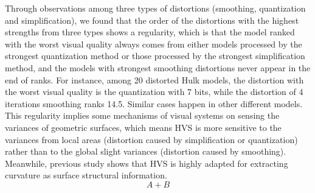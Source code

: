 Through observations among three types of distortions (smoothing, quantization and simplification), we found that the order of the distortions with the highest strengths from three types shows a regularity, which is that the model ranked with the worst visual quality always comes from either models processed by the strongest quantization method or those processed by the strongest simplification method, and the models with strongest smoothing distortions never appear in the end of ranks. For instance, among 20 distorted Hulk models, the distortion with the worst visual quality is the quantization with 7 bits, while the distortion of 4 iterations smoothing ranks 14.5.  Similar cases happen in other different models. This regularity implies some mechanisms of visual systems on sensing the variances of geometric surfaces, which means HVS is more sensitive to the variances from local areas (distortion caused by simplification or quantization) rather than to the global slight variances (distortion caused by smoothing). Meanwhile, previous study shows that HVS is highly adapted for extracting curvature as surface structural information.\\
\begin{equation}
A+B
\end{equation}